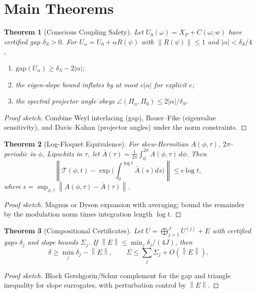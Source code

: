 \documentclass[11pt]{article}
\theoremstyle{plain}
\newtheorem{theorem}{Theorem}[section]
\theoremstyle{definition}
\newcommand{\gap}{\mathrm{gap}}
\newcommand{\norm}[1]{\left\lVert #1 \right\rVert}
\begin{document}
\section{Main Theorems}\label{sec:theorems}
\begin{theorem}[Conscious Coupling Safety]\label{thm:conscious-safety}
Let $U_0(\omega)=X_P+C(\omega;w)$ have certified gap $\delta_S>0$. For $U_\alpha=U_0+\alpha R(\psi)$ with $\norm{R(\psi)}\le 1$ and $|\alpha|<\delta_S/4$,
\begin{enumerate}[label=\roman*)]
  \item $\gap(U_\alpha)\ge \delta_S-2|\alpha|$;
  \item the eigen-slope bound inflates by at most $c|\alpha|$ for explicit $c$; 
  \item the spectral projector angle obeys $\angle(\Pi_\alpha,\Pi_0)\le 2|\alpha|/\delta_S$.
\end{enumerate}
\end{theorem}
\begin{proof}[Proof sketch]
Combine Weyl interlacing (gap), Bauer--Fike (eigenvalue sensitivity), and Davis--Kahan (projector angles) under the norm constraints.
\end{proof}

\begin{theorem}[Log-Floquet Equivalence]\label{thm:log-floquet}
For skew-Hermitian $A(\phi,\tau)$, $2\pi$-periodic in $\phi$, Lipschitz in $\tau$, let $\bar A(\tau)=\tfrac{1}{2\pi}\int_0^{2\pi}A(\phi,\tau)\,d\phi$. Then
\[
\norm{\mathcal{T}(\phi,t)-\exp\!\big(\int_0^{\log t}\bar A(s)ds\big)}\le \epsilon\log t,
\]
where $\epsilon=\sup_{\phi,\tau}\norm{A(\phi,\tau)-\bar A(\tau)}$.
\end{theorem}
\begin{proof}[Proof sketch]
Magnus or Dyson expansion with averaging; bound the remainder by the modulation norm times integration length $\log t$.
\end{proof}

\begin{theorem}[Compositional Certificates]\label{thm:composition}
Let $U=\bigoplus_{j=1}^J U^{(j)}+E$ with certified gaps $\delta_j$ and slope bounds $\Sigma_j$. If $\norm{E}\le \min_j\delta_j/(4J)$, then 
\[
\delta \ge \min_j\delta_j-\norm{E},\qquad \Sigma\le \sum_j \Sigma_j + O(\norm{E}).
\]
\end{theorem}
\begin{proof}[Proof sketch]
Block Gershgorin/Schur complement for the gap and triangle inequality for slope surrogates, with perturbation control by $\norm{E}$.
\end{proof}
\end{document}
